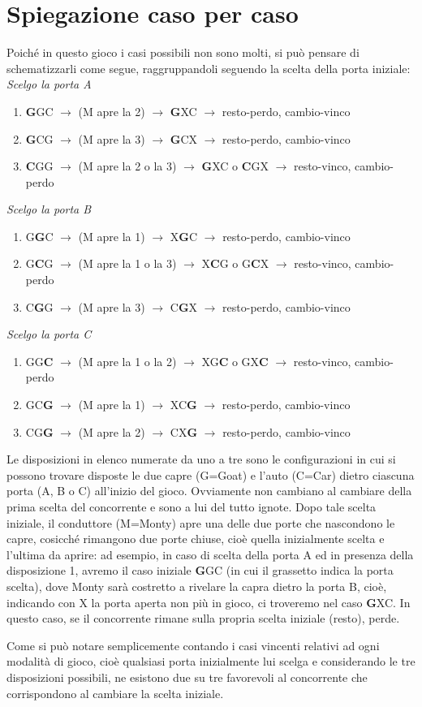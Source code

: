 \documentclass[a4paper, 12pt]{report}
\begin{document}
\section{Spiegazione caso per caso}
Poiché in questo gioco i casi possibili non sono molti, si può pensare di schematizzarli come segue, raggruppandoli seguendo la scelta della porta iniziale:
\newline
\textit{Scelgo la porta A}
\begin{enumerate}
	\item \textbf{G}GC $\rightarrow$ (M apre la 2) $\rightarrow$ \textbf{G}XC $\rightarrow$ resto-perdo, cambio-vinco
	\item \textbf{G}CG $\rightarrow$ (M apre la 3) $\rightarrow$ \textbf{G}CX $\rightarrow$ resto-perdo, cambio-vinco
	\item \textbf{C}GG $\rightarrow$ (M apre la 2 o la 3) $\rightarrow$ \textbf{G}XC o \textbf{C}GX $\rightarrow$ resto-vinco, cambio-perdo
\end{enumerate}
\textit{Scelgo la porta B}
\begin{enumerate}
	\item G\textbf{G}C $\rightarrow$ (M apre la 1) $\rightarrow$ X\textbf{G}C $\rightarrow$ resto-perdo, cambio-vinco
	\item G\textbf{C}G $\rightarrow$ (M apre la 1 o la 3) $\rightarrow$ X\textbf{C}G o G\textbf{C}X $\rightarrow$ resto-vinco, cambio-perdo
	\item C\textbf{G}G $\rightarrow$ (M apre la 3) $\rightarrow$ C\textbf{G}X $\rightarrow$ resto-perdo, cambio-vinco
\end{enumerate}
\textit{Scelgo la porta C}
\begin{enumerate}
	\item GG\textbf{C} $\rightarrow$ (M apre la 1 o la 2) $\rightarrow$ XG\textbf{C} o GX\textbf{C} $\rightarrow$ resto-vinco, cambio-perdo
	\item GC\textbf{G} $\rightarrow$ (M apre la 1) $\rightarrow$ XC\textbf{G} $\rightarrow$ resto-perdo, cambio-vinco
	\item CG\textbf{G} $\rightarrow$ (M apre la 2) $\rightarrow$ CX\textbf{G} $\rightarrow$ resto-perdo, cambio-vinco
\end{enumerate}

Le disposizioni in elenco numerate da uno a tre sono le configurazioni in cui si possono trovare disposte le due capre (G=Goat) e l'auto (C=Car) dietro ciascuna porta (A, B o C) all'inizio del gioco. Ovviamente non cambiano al cambiare della prima scelta del concorrente e sono a lui del tutto ignote. Dopo tale scelta iniziale, il conduttore (M=Monty) apre una delle due porte che nascondono le capre, cosicché rimangono due porte chiuse, cioè quella inizialmente scelta e l'ultima da aprire: ad esempio, in caso di scelta della porta A ed in presenza della disposizione 1, avremo il caso iniziale \textbf{G}GC (in cui il grassetto indica la porta scelta), dove Monty sarà costretto a rivelare la capra dietro la porta B, cioè, indicando con X la porta aperta non più in gioco, ci troveremo nel caso \textbf{G}XC. In questo caso, se il concorrente rimane sulla propria scelta iniziale (resto), perde.

Come si può notare semplicemente contando i casi vincenti relativi ad ogni modalità di gioco, cioè qualsiasi porta inizialmente lui scelga e considerando le tre disposizioni possibili, ne esistono due su tre favorevoli al concorrente che corrispondono al cambiare la scelta iniziale.
\end{document}
